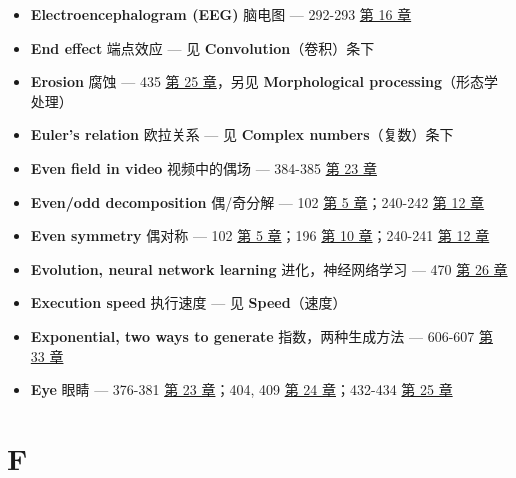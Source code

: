 \begin{itemize}
  \begin{itemize}
  \tightlist
  \item
    phasor transform method：相量变换法 --- 563-566 
    \hyperref[ch-30]{第 30 章}
  \item
    Laplace transform method：拉普拉斯变换法 --- 592-599 
    \hyperref[ch-32]{第 32 章}
  \end{itemize}
\item
  \textbf{Electroencephalogram (EEG)} 脑电图 --- 292-293 
  \hyperref[ch-16]{第 16 章}
\item
  \textbf{End effect} 端点效应 --- 见 \textbf{Convolution}（卷积）条下
\item
  \textbf{Erosion} 腐蚀 --- 435  \hyperref[ch-25]{第 25
  章}，另见 \textbf{Morphological processing}（形态学处理）
\item
  \textbf{Euler's relation} 欧拉关系 --- 见 \textbf{Complex
  numbers}（复数）条下
\item
  \textbf{Even field in video} 视频中的偶场 --- 384-385 
  \hyperref[ch-23]{第 23 章}
\item
  \textbf{Even/odd decomposition} 偶/奇分解 --- 102 
  \hyperref[ch-05]{第 5 章}；240-242  \hyperref[ch-12]{第 12
  章}
\item
  \textbf{Even symmetry} 偶对称 --- 102  \hyperref[ch-05]{第 5
  章}；196  \hyperref[ch-10]{第 10 章}；240-241 
  \hyperref[ch-12]{第 12 章}
\item
  \textbf{Evolution, neural network learning} 进化，神经网络学习 --- 470
   \hyperref[ch-26]{第 26 章}
\item
  \textbf{Execution speed} 执行速度 --- 见 \textbf{Speed}（速度）
\item
  \textbf{Exponential, two ways to generate} 指数，两种生成方法 ---
  606-607  \hyperref[ch-33]{第 33 章}
\item
  \textbf{Eye} 眼睛 --- 376-381  \hyperref[ch-23]{第 23
  章}；404, 409  \hyperref[ch-24]{第 24 章}；432-434
   \hyperref[ch-25]{第 25 章}
\end{itemize}

\section{F}

